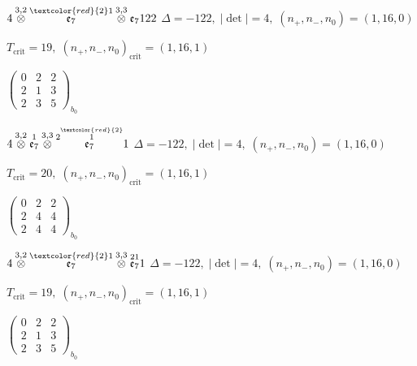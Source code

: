 \documentclass[10pt]{article}
\begin{document}
\smallskip

$4\overset{3,2}{\otimes}\overset{\textcolor{red}{2}1}{\mathfrak{e}_7}\overset{3,3}{\otimes}\mathfrak{e}_7122$ \quad $\Delta=-122,\; |\det|=4,\; (n_+,n_-,n_0)=(1,16,0)$

\hspace{1em}$T_{\text{crit}}=19,\; (n_+,n_-,n_0)_{\text{crit}}=(1,16,1)$

\hspace{2em}$\left(\begin{smallmatrix}0 & 2 & 2 \\ 2 & 1 & 3 \\ 2 & 3 & 5\end{smallmatrix}\right)_{\!b_0}$

\smallskip

$4\overset{3,2}{\otimes}\overset{1}{\mathfrak{e}_7}\overset{3,3}{\otimes}\overset{2\overset{\textcolor{red}{2}}{1}}{\mathfrak{e}_7}1$ \quad $\Delta=-122,\; |\det|=4,\; (n_+,n_-,n_0)=(1,16,0)$

\hspace{1em}$T_{\text{crit}}=20,\; (n_+,n_-,n_0)_{\text{crit}}=(1,16,1)$

\hspace{2em}$\left(\begin{smallmatrix}0 & 2 & 2 \\ 2 & 4 & 4 \\ 2 & 4 & 4\end{smallmatrix}\right)_{\!b_0}$

$4\overset{3,2}{\otimes}\overset{\textcolor{red}{2}1}{\mathfrak{e}_7}\overset{3,3}{\otimes}\overset{21}{\mathfrak{e}_7}1$ \quad $\Delta=-122,\; |\det|=4,\; (n_+,n_-,n_0)=(1,16,0)$

\hspace{1em}$T_{\text{crit}}=19,\; (n_+,n_-,n_0)_{\text{crit}}=(1,16,1)$

\hspace{2em}$\left(\begin{smallmatrix}0 & 2 & 2 \\ 2 & 1 & 3 \\ 2 & 3 & 5\end{smallmatrix}\right)_{\!b_0}$

\smallskip
\end{document}
